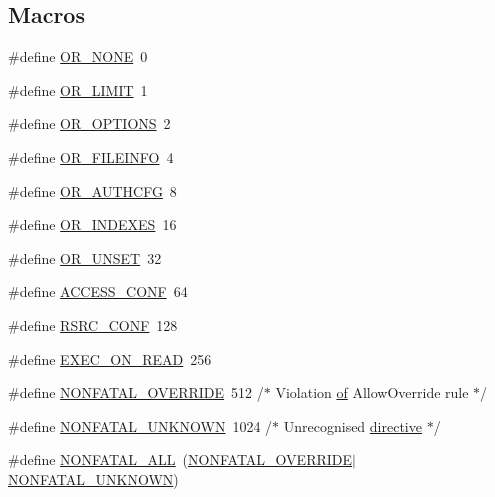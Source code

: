 \subsection*{Macros}
\begin{DoxyCompactItemize}
\item 
\#define \hyperlink{group__ConfigDirectives_ga823d55afe09c8ed42a0563408bcabb28}{O\+R\+\_\+\+N\+O\+NE}~0
\item 
\#define \hyperlink{group__ConfigDirectives_ga0dd271e08b921855a2ad2c9dcc1da3ca}{O\+R\+\_\+\+L\+I\+M\+IT}~1
\item 
\#define \hyperlink{group__ConfigDirectives_ga498a222873d29356a1ab9bd3f936b270}{O\+R\+\_\+\+O\+P\+T\+I\+O\+NS}~2
\item 
\#define \hyperlink{group__ConfigDirectives_ga3f1f59e707b2f247220fe64d06cb557d}{O\+R\+\_\+\+F\+I\+L\+E\+I\+N\+FO}~4
\item 
\#define \hyperlink{group__ConfigDirectives_gad707d4eac4b22c5bc225b784ecb6c90e}{O\+R\+\_\+\+A\+U\+T\+H\+C\+FG}~8
\item 
\#define \hyperlink{group__ConfigDirectives_ga1470585899bbca9fd583e49f17336e1b}{O\+R\+\_\+\+I\+N\+D\+E\+X\+ES}~16
\item 
\#define \hyperlink{group__ConfigDirectives_ga45fe697d7e968bc74055405fa88cad13}{O\+R\+\_\+\+U\+N\+S\+ET}~32
\item 
\#define \hyperlink{group__ConfigDirectives_ga09a3c6983aa6dc02f1d1f49aea0ff4ee}{A\+C\+C\+E\+S\+S\+\_\+\+C\+O\+NF}~64
\item 
\#define \hyperlink{group__ConfigDirectives_ga2c51f4c7392fa5af1afe797470dc16e3}{R\+S\+R\+C\+\_\+\+C\+O\+NF}~128
\item 
\#define \hyperlink{group__ConfigDirectives_ga8f341ad63fbdf12570b18ad4bee37af8}{E\+X\+E\+C\+\_\+\+O\+N\+\_\+\+R\+E\+AD}~256
\item 
\#define \hyperlink{group__ConfigDirectives_gabc95fb6d27d4b38ad1c9c9eb8ad1f730}{N\+O\+N\+F\+A\+T\+A\+L\+\_\+\+O\+V\+E\+R\+R\+I\+DE}~512    /$\ast$ Violation \hyperlink{pcre_8txt_a9d5b55a535a7d176d14b62d664b47b4d}{of} Allow\+Override rule $\ast$/
\item 
\#define \hyperlink{group__ConfigDirectives_gaba09c50b2ee2e4a4f2b4140cf3634ee8}{N\+O\+N\+F\+A\+T\+A\+L\+\_\+\+U\+N\+K\+N\+O\+WN}~1024    /$\ast$ Unrecognised \hyperlink{basic-configuration_8txt_afff511b23780162b3e88a118ec5cb4c9}{directive} $\ast$/
\item 
\#define \hyperlink{group__ConfigDirectives_ga1b80da4b0c6f3d8e9afdc07acdd724ec}{N\+O\+N\+F\+A\+T\+A\+L\+\_\+\+A\+LL}~(\hyperlink{group__ConfigDirectives_gabc95fb6d27d4b38ad1c9c9eb8ad1f730}{N\+O\+N\+F\+A\+T\+A\+L\+\_\+\+O\+V\+E\+R\+R\+I\+DE}$\vert$\hyperlink{group__ConfigDirectives_gaba09c50b2ee2e4a4f2b4140cf3634ee8}{N\+O\+N\+F\+A\+T\+A\+L\+\_\+\+U\+N\+K\+N\+O\+WN})

\end{DoxyCompactItemize}

